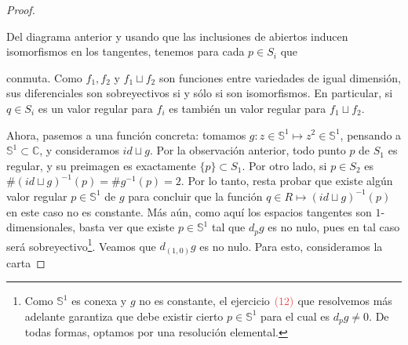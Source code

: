 \documentclass[11pt]{article}
\newcommand{\C}{\mathbb{C}}
\newcommand{\Ss}{\mathbb{S}}
\newcommand{\paint}[2]{\color{#1}{#2}}
\newcommand*{\isoarrow}[1]{\arrow[#1,"\rotatebox{90}{\LARGE{\(\sim\)}}"
]}
\begin{document}
\begin{proof}
\begin{center}
\end{center}
Del diagrama anterior y usando que las inclusiones de abiertos inducen isomorfismos en los tangentes, tenemos para cada $p \in S_i$ que
\begin{center}
\end{center}
conmuta. Como $f_1,f_2$ y $f_1 \sqcup f_2$ son funciones entre variedades de igual dimensi\'on, sus diferenciales son sobreyectivos si y s\'olo si son isomorfismos. En particular, si $q \in S_i$ es un valor regular para $f_i$ es tambi\'en un valor regular para $f_1 \sqcup f_2$.

Ahora, pasemos a una funci\'on concreta: tomamos $g : z \in \Ss^1 \mapsto z^2 \in \Ss^1$, pensando a $\Ss^1 \subset \C$, y consideramos $id \sqcup g$. Por la observaci\'on anterior, todo punto $p$ de $S_1$ es regular, y su preimagen es exactamente $\{p\} \subset S_1$. Por otro lado, si $p \in S_2$ es $\#(id \sqcup g )^{-1}(p) = \#g^{-1}(p) = 2$. Por lo tanto, resta probar que existe alg\'un valor regular $p \in \Ss^1$ de $g$ para concluir que la funci\'on $q \in R \mapsto (id \sqcup g)^{-1}(p)$ en este caso no es constante. M\'as a\'un, como aqu\'i los espacios tangentes son $1$-dimensionales, basta ver que existe $p \in \Ss^1$ tal que $d_pg$ es no nulo, pues en tal caso ser\'a sobreyectivo\footnote{Como $\Ss^1$ es conexa y $g$ no es constante, el ejercicio $\paint{red}{(12)}$ que resolvemos m\'as adelante garantiza que debe existir cierto $p \in \Ss^1$ para el cual es $d_pg \neq 0$. De todas formas, optamos por una resoluci\'on elemental.}. Veamos que $d_{(1,0)}g$ es no nulo. Para esto, consideramos la carta


\end{proof}
\end{document}
